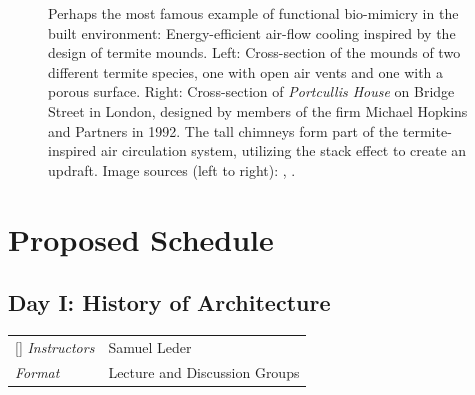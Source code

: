 \documentclass{article}
\begin{document}
\begin{figure}[ht!]
    \centering
    \caption{Perhaps the most famous example of functional bio-mimicry in the built environment: Energy-efficient air-flow cooling inspired by the design of termite mounds. Left: Cross-section of the mounds of two different termite species, one with open air vents and one with a porous surface. Right: Cross-section of \textit{Portcullis House} on Bridge Street in London, designed by members of the firm Michael Hopkins and Partners in 1992. The tall chimneys form part of the termite-inspired air circulation system, utilizing the stack effect to create an updraft. \newline Image sources (left to right): \cite{turner_beyond_2008}, \cite{davies_hopkins2_2001}.}
    \label{fig:porte_binet}
\end{figure}


\clearpage
\section{Proposed Schedule}
\subsection{Day I: History of Architecture}

\begin{NiceTabular}{W{l}{2cm}l}[]
\textit{Instructors} & Samuel Leder \\
\textit{Format} & Lecture and Discussion Groups
\end{NiceTabular}
\end{document}
